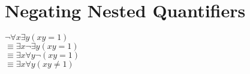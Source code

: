\documentclass{article}
\begin{document}
\pagebreak
\section{Negating Nested Quantifiers}

\begin{center}

    $\neg \forall x\exists y(xy = 1)$
\\
    $\equiv \exists x\neg \exists y(xy = 1)$
\\
    $\equiv \exists x\forall y\neg (xy=1)$
\\
    $\equiv \exists x\forall y(xy\neq 1)$
\end{center}
\end{document}
